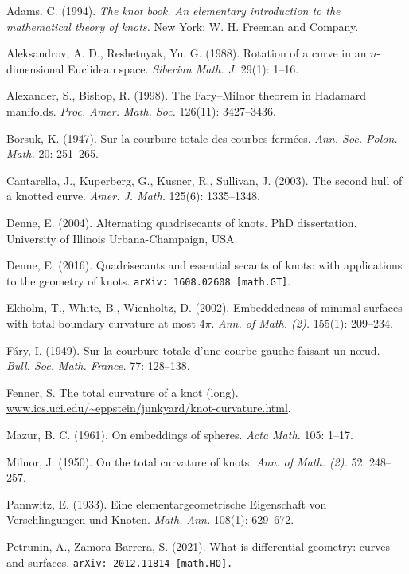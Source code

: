 \documentclass{article}
\theoremstyle{theorem}
\newtheorem{Crofton-type formula}[theorem]{Crofton-type formula}
\newtheorem{Douglas--Rado theorem}[theorem]{\arXiv{Douglas--Rado theorem}{Theorem}}
\newtheorem{Extended monotonicity theorem}[theorem]{\arXiv{Extended monotonicity theorem}{Theorem}}
\theoremstyle{definition}
\begin{document}
\begin{thebibliography}{2}
Adams. C. (1994).
\textit{The knot book. An elementary introduction to the mathematical theory of knots.}
New York:
W. H. Freeman and Company. 

Aleksandrov, A. D., Reshetnyak, Yu. G.
(1988).
Rotation of a curve in an $n$-dimensional Euclidean
space. \textit{Siberian Math. J.} 29(1): 1--16.

Alexander, S., Bishop, R.
(1998).
The Fary--Milnor theorem in Hadamard manifolds.
\textit{Proc. Amer. Math. Soc.}
126(11): 3427--3436.

Borsuk, K.
(1947).
Sur la courbure totale des courbes fermées. \textit{Ann. Soc. Polon. Math.} 20: 251--265.


Cantarella, J., Kuperberg, G., Kusner, R., Sullivan, J. (2003). The second hull of a knotted curve.
\textit{Amer. J. Math.} 125(6): 1335--1348.


Denne, E. (2004). Alternating quadrisecants of knots. PhD dissertation. University of Illinois Urbana-Champaign, USA.


Denne, E. (2016). Quadrisecants and essential secants of knots: with applications to the geometry
of knots. \texttt{arXiv: 1608.02608 [math.GT]}.

Ekholm, T., White, B., Wienholtz, D. (2002).
Embeddedness of minimal surfaces with total boundary
curvature at most $4\pi$. \textit{Ann. of Math. (2).} 155(1): 209--234.


Fáry, I. (1949). Sur la courbure totale d’une courbe gauche faisant un nœud. \textit{Bull. Soc. Math.
France.} 77: 128–138.

\!\!\!Fenner, S. The total curvature of a knot (long). \url{www.ics.uci.edu/~eppstein/junkyard/knot-curvature.html}.


\!\!\!Mazur, B. C.
(1961).
On embeddings of spheres.
\textit{Acta Math.} 105: 1–17.

\!\!\!Milnor, J.
(1950).
On the total curvature of knots.
\textit{Ann. of Math. (2).} 52: 248--257.


\!\!\!Pannwitz, E. 
(1933).
Eine elementargeometrische Eigenschaft von Verschlingungen und Knoten.
\textit{Math. Ann.} 108(1): 629--672.


\!\!\!Petrunin, A., Zamora Barrera, S.
(2021).
What is differential geometry: curves and surfaces.
\texttt{arXiv: 2012.11814 [math.HO].}



\end{thebibliography}
\end{document}
